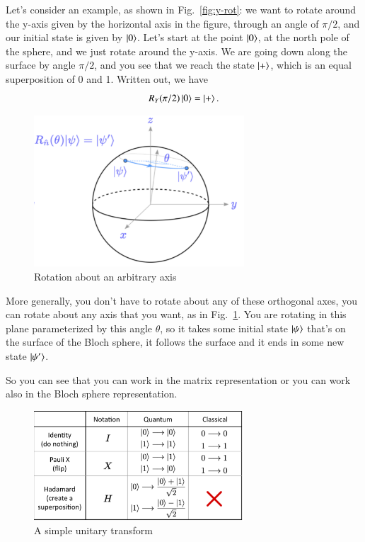 Let's consider an example, as shown in Fig.~\ref{fig:y-rot}: we want to rotate around the y-axis given by the horizontal axis in the figure, through an angle of $\pi/2$, and our initial state is given by $\left| 0 \right\rangle$.  Let's start at the point $\left| 0 \right\rangle$, at the north pole of the sphere, and we just rotate around the y-axis. We are going down along the surface by angle $\pi/2$, and you see that we reach the state $\left| + \right\rangle$, which is an equal superposition of 0 and 1.  Written out, we have
\begin{equation}
R_{Y}(\pi / 2)\left| 0 \right\rangle=\left| + \right\rangle.
\end{equation}

\begin{figure}[H]
    \centering
    \includegraphics[width=0.7\textwidth]{lesson2/bloch_general_axis.pdf}
    
        \caption{Rotation about an arbitrary axis}
    
    \label{fig:arb-rot}
\end{figure}

More generally, you don't have to rotate about any of these orthogonal axes, you can rotate about any axis that you want, as in Fig.~\ref{fig:arb-rot}. You are rotating in this plane parameterized by this angle $\theta$, so it takes some initial state $\left| \psi \right\rangle$ that's on the surface of the Bloch sphere, it follows the surface and it ends in some new state $\left| \psi' \right\rangle$. 

So you can see that you can work in the matrix representation or you can work also in the Bloch sphere representation.

\begin{figure}[H]
    \centering
    \includegraphics[width=0.7\textwidth]{lesson2/simple_unitary_ops.pdf}
    
        \caption{A simple unitary transform}
    
    \label{fig: 1}
\end{figure}


